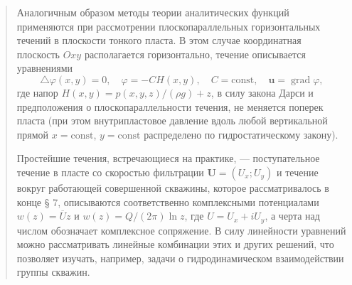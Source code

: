 \documentclass[12pt,a4paper]{article}
\DeclareMathOperator{\grad}{grad}
\newenvironment{textquote}{\begin{quote}\sloppy}{\end{quote}}
\begin{document}
\begin{textquote}
Аналогичным образом методы теории аналитических функций применяются при рассмотрении плоскопараллельных горизонтальных течений в плоскости тонкого пласта. В этом случае координатная плоскость $Oxy$ располагается горизонтально, течение описывается уравнениями
\[
\triangle\varphi(x,y)=0,\quad\varphi=-CH(x,y),\quad C=\mathrm{const},\quad\boldsymbol{u}=\grad\varphi,
\]
где напор $H(x,y)=p(x,y,z)/(\rho g)+z$, в силу закона Дарси и предположения о плоскопараллельности течения, не меняется поперек пласта (при этом внутрипластовое давление вдоль любой вертикальной прямой $x=\mathrm{const}$, $y=\mathrm{const}$ распределено по гидростатическому закону).

Простейшие течения, встречающиеся на практике, --- поступательное течение в пласте со скоростью фильтрации $\boldsymbol{U}=(U_x;U_y)$ и течение вокруг работающей совершенной скважины, которое рассматривалось в конце § 7, описываются соответственно комплексными потенциалами $w(z)=\overline{U}z$ и $w(z)=Q/(2\pi)\ln z$, где $U=U_x+iU_y$, а черта над числом обозначает комплексное сопряжение. В силу линейности уравнений можно рассматривать линейные комбинации этих и других решений, что позволяет изучать, например, задачи о гидродинамическом взаимодействии группы скважин.
\end{textquote}
\end{document}
